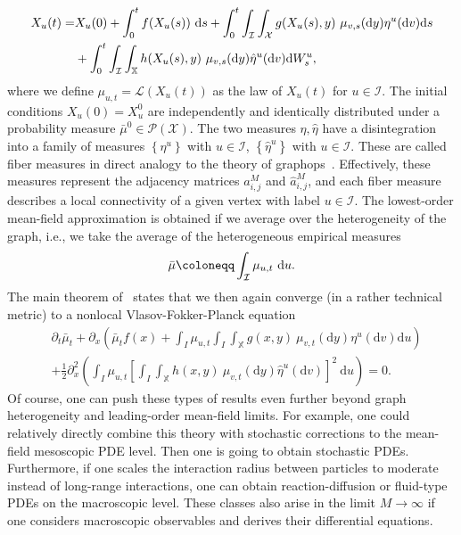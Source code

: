 \documentclass[10pt]{article}
\def\cI{\mathcal{I}}
\def\cX{\mathcal{X}}
\def\txtd{{\textnormal{d}}}
\def\ra{\rightarrow}
\def\I{\infty}
\newcommand{\be}{\begin{equation}}
\newcommand{\ee}{\end{equation}}
\newcommand{\benn}{\begin{equation*}}
\newcommand{\eenn}{\end{equation*}}
\begin{document}
\be
\begin{split}
	X_u(t) =& X_u(0) + \int_{0}^{t} f(X_u(s)) ~\txtd  s + \int_{0}^t \int_\cI \int_{\cX} g(X_u(s), y) ~\mu_{v, s}(\txtd y)\eta^u(\txtd v) \txtd s \\
	&+ \int_{0}^t \int_\cI \int_{\mathbb{X}} h(X_u(s), y)~\mu_{v, s}(\txtd y)\hat{\eta}^u(\txtd v) \txtd W_s^u,
\end{split}
\label{cekk_eq:indep}
\end{equation}
where we define $\mu_{u,t} = \mathcal{L}(X_u(t))$ as the law of $X_u(t)$ for $u\in \cI$. The initial conditions $X_u(0)=X_u^0$ are independently and identically distributed under a probability measure $\bar{\mu}^0\in\mathcal{P}(\cX)$. The two measures $\eta,\hat{\eta}$ have a disintegration into a family of measures $\left\{\eta^u\right\}$ with $u \in \cI$, $\left\{\hat{\eta}^u\right\}$ with $u \in \cI$. These are called fiber measures \cite{BackhauszSzegedy} in direct analogy to the theory of graphops~\cite{KuehnGraphops}. Effectively, these measures represent the adjacency matrices $a^M_{i,j}$ and $\hat{a}^M_{i,j}$, and each fiber measure describes a local connectivity of a given vertex with label $u\in\cI$. The lowest-order mean-field approximation is obtained if we average over the heterogeneity of the graph, i.e., we take the average of the heterogeneous empirical measures
\benn
\bar{\mu} \coloneqq \int_\cI \mu_{u,t} ~ \txtd u.
\eenn 
The main theorem of~\cite{KuehnPulido} states that we then again converge (in a rather technical metric) to a nonlocal Vlasov-Fokker-Planck\index{} equation 
\be
\begin{split}
&\partial_t \bar{\mu}_{t} + \partial_x \left(\bar{\mu}_{t} f(x) + \int_I{\mu}_{u,t} \int_I \int_{\mathbb{X}} g(x,y) ~\mu_{v,t}(\text{d}y) \eta^u(\text{d}v)\text{d}u\right) \\
&+ \frac{1}{2}\partial_x^2\left(\int_I {\mu}_{u,t} \left[\int_I \int_{\mathbb{X}} h(x,y) ~\mu_{v,t}(\text{d}y) \hat{\eta}^u(\text{d}v)\right]^2~\text{d}u\right)=0.
\end{split}
\ee
Of course, one can push these types of results even further beyond graph heterogeneity and leading-order mean-field limits. For example, one could relatively directly combine this theory with stochastic corrections to the mean-field mesoscopic PDE level. Then one is going to obtain stochastic PDEs. Furthermore, if one scales the interaction radius between particles to moderate instead of long-range interactions, one can obtain reaction-diffusion or fluid-type PDEs on the macroscopic level. These classes also arise in the limit $M\ra \I$ if one considers macroscopic observables and derives their differential equations. 
\end{document}
